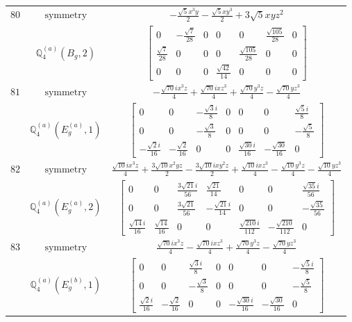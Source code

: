 \documentclass[fleqn,8pt,landscape]{jsarticle}
\begin{document}
\begin{longtable}{ccc}
$ 80 $ & $ \text{symmetry} $ & $ - \frac{\sqrt{5} x^{3} y}{2} - \frac{\sqrt{5} x y^{3}}{2} + 3 \sqrt{5} x y z^{2} $ \\
$  $ & $ \mathbb{Q}_{4}^{(a)}(B_{g},2) $ & $ \begin{bmatrix} 0 & - \frac{\sqrt{7}}{28} & 0 & 0 & 0 & \frac{\sqrt{105}}{28} & 0 \\ \frac{\sqrt{7}}{28} & 0 & 0 & 0 & \frac{\sqrt{105}}{28} & 0 & 0 \\ 0 & 0 & 0 & \frac{\sqrt{42}}{14} & 0 & 0 & 0 \end{bmatrix} $ \\ \hline
$ 81 $ & $ \text{symmetry} $ & $ - \frac{\sqrt{70} i x^{3} z}{4} + \frac{\sqrt{70} i x z^{3}}{4} + \frac{\sqrt{70} y^{3} z}{4} - \frac{\sqrt{70} y z^{3}}{4} $ \\
$  $ & $ \mathbb{Q}_{4}^{(a)}(E_{g}^{(a)},1) $ & $ \begin{bmatrix} 0 & 0 & - \frac{\sqrt{3} i}{8} & 0 & 0 & 0 & \frac{\sqrt{5} i}{8} \\ 0 & 0 & - \frac{\sqrt{3}}{8} & 0 & 0 & 0 & - \frac{\sqrt{5}}{8} \\ - \frac{\sqrt{2} i}{16} & - \frac{\sqrt{2}}{16} & 0 & 0 & \frac{\sqrt{30} i}{16} & - \frac{\sqrt{30}}{16} & 0 \end{bmatrix} $ \\ \hline
$ 82 $ & $ \text{symmetry} $ & $ \frac{\sqrt{10} i x^{3} z}{4} + \frac{3 \sqrt{10} x^{2} y z}{2} - \frac{3 \sqrt{10} i x y^{2} z}{2} + \frac{\sqrt{10} i x z^{3}}{4} - \frac{\sqrt{10} y^{3} z}{4} - \frac{\sqrt{10} y z^{3}}{4} $ \\
$  $ & $ \mathbb{Q}_{4}^{(a)}(E_{g}^{(a)},2) $ & $ \begin{bmatrix} 0 & 0 & \frac{3 \sqrt{21} i}{56} & \frac{\sqrt{21}}{14} & 0 & 0 & \frac{\sqrt{35} i}{56} \\ 0 & 0 & \frac{3 \sqrt{21}}{56} & - \frac{\sqrt{21} i}{14} & 0 & 0 & - \frac{\sqrt{35}}{56} \\ \frac{\sqrt{14} i}{16} & \frac{\sqrt{14}}{16} & 0 & 0 & \frac{\sqrt{210} i}{112} & - \frac{\sqrt{210}}{112} & 0 \end{bmatrix} $ \\ \hline
$ 83 $ & $ \text{symmetry} $ & $ \frac{\sqrt{70} i x^{3} z}{4} - \frac{\sqrt{70} i x z^{3}}{4} + \frac{\sqrt{70} y^{3} z}{4} - \frac{\sqrt{70} y z^{3}}{4} $ \\
$  $ & $ \mathbb{Q}_{4}^{(a)}(E_{g}^{(b)},1) $ & $ \begin{bmatrix} 0 & 0 & \frac{\sqrt{3} i}{8} & 0 & 0 & 0 & - \frac{\sqrt{5} i}{8} \\ 0 & 0 & - \frac{\sqrt{3}}{8} & 0 & 0 & 0 & - \frac{\sqrt{5}}{8} \\ \frac{\sqrt{2} i}{16} & - \frac{\sqrt{2}}{16} & 0 & 0 & - \frac{\sqrt{30} i}{16} & - \frac{\sqrt{30}}{16} & 0 \end{bmatrix} $ \\ \hline

\end{longtable}
\end{document}
